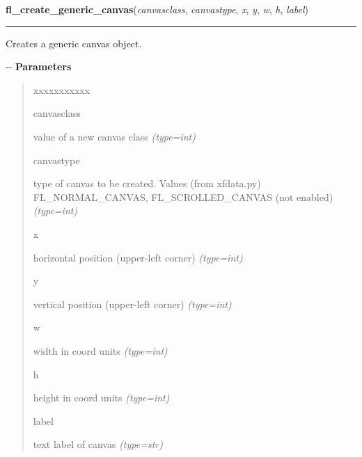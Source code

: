     \vspace{0.5ex}

\hspace{.8\funcindent}\begin{boxedminipage}{\funcwidth}

    \raggedright \textbf{fl\_create\_generic\_canvas}(\textit{canvasclass}, \textit{canvastype}, \textit{x}, \textit{y}, \textit{w}, \textit{h}, \textit{label})

    \vspace{-1.5ex}

    \rule{\textwidth}{0.5\fboxrule}
\setlength{\parskip}{2ex}

Creates a generic canvas object.

-{}-
\setlength{\parskip}{1ex}
      \textbf{Parameters}
      \vspace{-1ex}

      \begin{quote}
        \begin{Ventry}{xxxxxxxxxxx}

          \item[canvasclass]


value of a new canvas class
            {\it (type=int)}

          \item[canvastype]


type of canvas to be created. Values (from xfdata.py) FL\_NORMAL\_CANVAS,
FL\_SCROLLED\_CANVAS (not enabled)
            {\it (type=int)}

          \item[x]


horizontal position (upper-left corner)
            {\it (type=int)}

          \item[y]


vertical position (upper-left corner)
            {\it (type=int)}

          \item[w]


width in coord units
            {\it (type=int)}

          \item[h]


height in coord units
            {\it (type=int)}

          \item[label]


text label of canvas
            {\it (type=str)}

        \end{Ventry}


\end{quote}
\end{boxedminipage}
